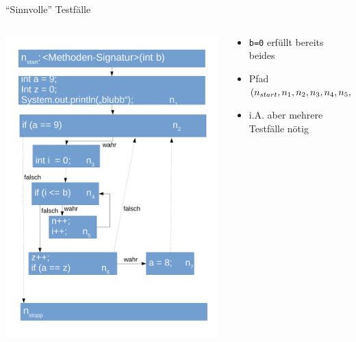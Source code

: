 \documentclass[18pt]{beamer}
\begin{document}
	\begin{frame}{\enquote{Sinnvolle} Testfälle}
		\begin{columns}
			\begin{column}{0.5\textwidth}
				\includegraphics[scale=0.27]{./pics/tut5/kfo-no-goto.pdf}
			\end{column}%
			\begin{column}{0.6\textwidth}
				\begin{itemize}
					\item \texttt{b=0} erfüllt bereits beides
					\item Pfad $(n_{start}, n_1, n_2, n_3, n_4, n_5, n_4, n_6, n_2, \dots, \linebreak n_6, n_7, n_2, n_{stopp})$
					\item i.A. aber mehrere Testfälle nötig
				\end{itemize}
			\end{column}
		\end{columns}
	\end{frame}
		
\end{document}
